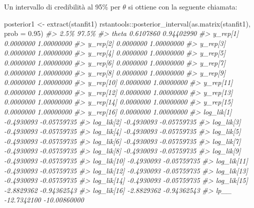 \documentclass[
]{memoir}
\newenvironment{Shaded}{\begin{snugshade}}{\end{snugshade}}
\newcommand{\AttributeTok}[1]{\textcolor[rgb]{0.77,0.63,0.00}{#1}}
\newcommand{\CommentTok}[1]{\textcolor[rgb]{0.56,0.35,0.01}{\textit{#1}}}
\newcommand{\FloatTok}[1]{\textcolor[rgb]{0.00,0.00,0.81}{#1}}
\newcommand{\FunctionTok}[1]{\textcolor[rgb]{0.00,0.00,0.00}{#1}}
\newcommand{\NormalTok}[1]{#1}
\newcommand{\OtherTok}[1]{\textcolor[rgb]{0.56,0.35,0.01}{#1}}
\newcommand{\SpecialCharTok}[1]{\textcolor[rgb]{0.00,0.00,0.00}{#1}}
\begin{document}
Un intervallo di credibilità al 95\% per \(\theta\) si ottiene con la seguente chiamata:

\begin{Shaded}
\begin{Highlighting}[]
\NormalTok{posterior1 }\OtherTok{\textless{}{-}} \FunctionTok{extract}\NormalTok{(stanfit1)}
\NormalTok{rstantools}\SpecialCharTok{::}\FunctionTok{posterior\_interval}\NormalTok{(}\FunctionTok{as.matrix}\NormalTok{(stanfit1), }\AttributeTok{prob =} \FloatTok{0.95}\NormalTok{)}
\CommentTok{\#\textgreater{}                    2.5\%        97.5\%}
\CommentTok{\#\textgreater{} theta         0.6107860   0.94402990}
\CommentTok{\#\textgreater{} y\_rep[1]      0.0000000   1.00000000}
\CommentTok{\#\textgreater{} y\_rep[2]      0.0000000   1.00000000}
\CommentTok{\#\textgreater{} y\_rep[3]      0.0000000   1.00000000}
\CommentTok{\#\textgreater{} y\_rep[4]      0.0000000   1.00000000}
\CommentTok{\#\textgreater{} y\_rep[5]      0.0000000   1.00000000}
\CommentTok{\#\textgreater{} y\_rep[6]      0.0000000   1.00000000}
\CommentTok{\#\textgreater{} y\_rep[7]      0.0000000   1.00000000}
\CommentTok{\#\textgreater{} y\_rep[8]      0.0000000   1.00000000}
\CommentTok{\#\textgreater{} y\_rep[9]      0.0000000   1.00000000}
\CommentTok{\#\textgreater{} y\_rep[10]     0.0000000   1.00000000}
\CommentTok{\#\textgreater{} y\_rep[11]     0.0000000   1.00000000}
\CommentTok{\#\textgreater{} y\_rep[12]     0.0000000   1.00000000}
\CommentTok{\#\textgreater{} y\_rep[13]     0.0000000   1.00000000}
\CommentTok{\#\textgreater{} y\_rep[14]     0.0000000   1.00000000}
\CommentTok{\#\textgreater{} y\_rep[15]     0.0000000   1.00000000}
\CommentTok{\#\textgreater{} y\_rep[16]     0.0000000   1.00000000}
\CommentTok{\#\textgreater{} log\_lik[1]   {-}0.4930093  {-}0.05759735}
\CommentTok{\#\textgreater{} log\_lik[2]   {-}0.4930093  {-}0.05759735}
\CommentTok{\#\textgreater{} log\_lik[3]   {-}0.4930093  {-}0.05759735}
\CommentTok{\#\textgreater{} log\_lik[4]   {-}0.4930093  {-}0.05759735}
\CommentTok{\#\textgreater{} log\_lik[5]   {-}0.4930093  {-}0.05759735}
\CommentTok{\#\textgreater{} log\_lik[6]   {-}0.4930093  {-}0.05759735}
\CommentTok{\#\textgreater{} log\_lik[7]   {-}0.4930093  {-}0.05759735}
\CommentTok{\#\textgreater{} log\_lik[8]   {-}0.4930093  {-}0.05759735}
\CommentTok{\#\textgreater{} log\_lik[9]   {-}0.4930093  {-}0.05759735}
\CommentTok{\#\textgreater{} log\_lik[10]  {-}0.4930093  {-}0.05759735}
\CommentTok{\#\textgreater{} log\_lik[11]  {-}0.4930093  {-}0.05759735}
\CommentTok{\#\textgreater{} log\_lik[12]  {-}0.4930093  {-}0.05759735}
\CommentTok{\#\textgreater{} log\_lik[13]  {-}0.4930093  {-}0.05759735}
\CommentTok{\#\textgreater{} log\_lik[14]  {-}0.4930093  {-}0.05759735}
\CommentTok{\#\textgreater{} log\_lik[15]  {-}2.8829362  {-}0.94362543}
\CommentTok{\#\textgreater{} log\_lik[16]  {-}2.8829362  {-}0.94362543}
\CommentTok{\#\textgreater{} lp\_\_        {-}12.7342100 {-}10.00860000}
\end{Highlighting}
\end{Shaded}
\end{document}
